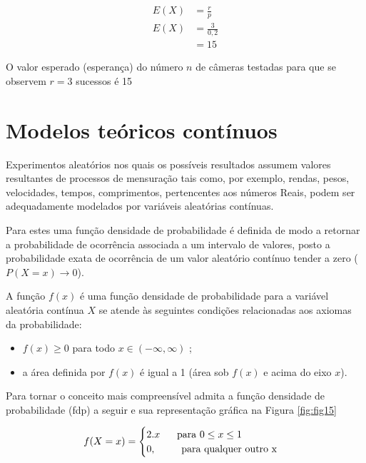 \documentclass[
]{book}
\begin{document}
\begin{align*}
E(X) &  = \frac{r}{p} \\
E(X) & = \frac{3}{0,2} \\
     & =15
\end{align*}

O valor esperado (esperança) do número \(n\) de câmeras testadas para que se observem \(r=3\) sucessos é 15

\hypertarget{modelos-teuxf3ricos-contuxednuos}{%
\section{Modelos teóricos contínuos}\label{modelos-teuxf3ricos-contuxednuos}}

Experimentos aleatórios nos quais os possíveis resultados assumem valores resultantes de processos de mensuração tais como, por exemplo, rendas, pesos, velocidades, tempos, comprimentos, pertencentes aos números Reais, podem ser adequadamente modelados por variáveis aleatórias contínuas.

\hfill\break

Para estes uma função densidade de probabilidade é definida de modo a retornar a probabilidade de ocorrência associada a um intervalo de valores, posto a probabilidade exata de ocorrência de um valor aleatório contínuo tender a zero (\(P(X=x) \to 0\)).

\hfill\break

A função \(f(x)\) é uma função densidade de probabilidade para a variável aleatória contínua \(X\) se atende às seguintes condições relacionadas aos axiomas da probabilidade:

\begin{itemize}
    \item $f(x) \ge 0$ para todo $x \in (-\infty, \infty) $ ;
    \item a área definida por $f(x)$ é igual a 1 (área sob $f(x)$ e acima do eixo $x$).
\end{itemize}

\hfill\break

Para tornar o conceito mais compreensível admita a função densidade de probabilidade (fdp) a seguir e sua representação gráfica na Figura \ref{fig:fig15}

\[
f(X=x)=
\begin{cases}
2 . x \hspace{0.6cm} \text{para } 0 \le x \le 1 \\
0, \hspace{0.9cm} \text{para qualquer outro x}\\
\end{cases}
\]
\end{document}
